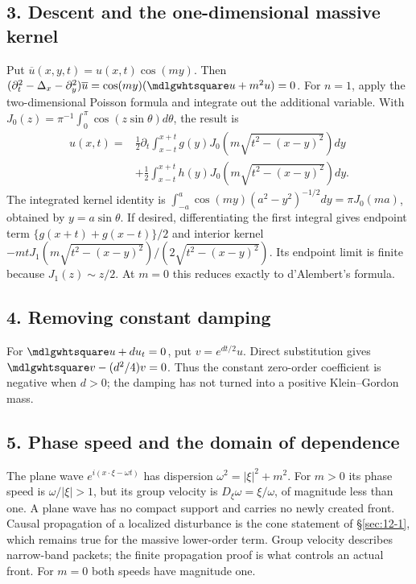 \subsection*{3. Descent and the one-dimensional massive kernel}
Put $\overline u(x,y,t)=u(x,t)\cos(my)$. Then
$(\partial_t^2-\Delta_x-\partial_y^2)\overline u
=\cos(my)(\PDEWave u+m^2u)=0$.
For $n=1$, apply the two-dimensional Poisson formula and integrate
out the additional variable. With
$J_0(z)=\pi^{-1}\int_0^\pi\cos(z\sin\theta)d\theta$, the result is
\[
 \begin{split}
 u(x,t)={}&\frac12\partial_t\int_{x-t}^{x+t}
       g(y)J_0\!\left(m\sqrt{t^2-(x-y)^2}\right)dy\\
 &+\frac12\int_{x-t}^{x+t}
       h(y)J_0\!\left(m\sqrt{t^2-(x-y)^2}\right)dy.
 \end{split}
\]
The integrated kernel identity is
$\int_{-a}^a\cos(my)(a^2-y^2)^{-1/2}dy=\pi J_0(ma)$,
obtained by $y=a\sin\theta$.
If desired, differentiating the first integral gives endpoint term
$\{g(x+t)+g(x-t)\}/2$ and interior kernel
$-mtJ_1(m\sqrt{t^2-(x-y)^2})/(2\sqrt{t^2-(x-y)^2})$.
Its endpoint limit is finite because $J_1(z)\sim z/2$.
At $m=0$ this reduces exactly to d'Alembert's formula.

\subsection*{4. Removing constant damping}
For $\PDEWave u+du_t=0$, put $v=e^{dt/2}u$.
Direct substitution gives $\PDEWave v-(d^2/4)v=0$.
Thus the constant zero-order coefficient is negative when $d>0$;
the damping has not turned into a positive Klein--Gordon mass.

\subsection*{5. Phase speed and the domain of dependence}
The plane wave $e^{i(x\cdot\xi-\omega t)}$ has dispersion
$\omega^2=|\xi|^2+m^2$. For $m>0$ its phase speed is
$\omega/|\xi|>1$, but its group velocity is
$D_\xi\omega=\xi/\omega$, of magnitude less than one.
A plane wave has no compact support and carries no newly created
front. Causal propagation of a localized disturbance is the cone
statement of \S\ref{sec:12-1}, which remains true for the massive
lower-order term. Group velocity describes narrow-band packets;
the finite propagation proof is what controls an actual front.
For $m=0$ both speeds have magnitude one.

